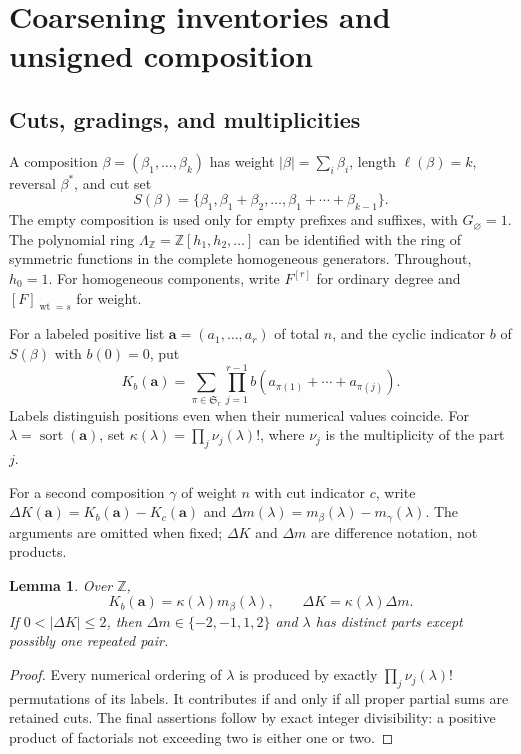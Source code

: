 \documentclass[11pt,a4paper]{amsart}
\numberwithin{equation}{section}
\theoremstyle{plain}
\newtheorem{lemma}[theorem]{Lemma}
\theoremstyle{definition}
\newcommand{\Z}{\mathbb Z}
\newcommand{\wt}{\operatorname{wt}}
\newcommand{\sort}{\operatorname{sort}}
\begin{document}
\section{Coarsening inventories and unsigned composition}\label{sec:algebra}

\subsection{Cuts, gradings, and multiplicities}
A composition \(\beta=(\beta_1,\ldots,\beta_k)\) has weight
\(|\beta|=\sum_i\beta_i\), length \(\ell(\beta)=k\), reversal \(\beta^*\), and cut set
\[
S(\beta)=\{\beta_1,\beta_1+\beta_2,\ldots,\beta_1+\cdots+\beta_{k-1}\}.
\]
The empty composition is used only for empty prefixes and suffixes, with
\(G_\varnothing=1\).  The polynomial ring
\(\Lambda_\Z=\Z[h_1,h_2,\ldots]\) can be identified with the ring of symmetric
functions in the complete homogeneous generators.  Throughout, \(h_0=1\).
For homogeneous components, write \(F^{[r]}\) for ordinary degree and
\([F]_{\wt=s}\) for weight.

For a labeled positive list \(\mathbf a=(a_1,\ldots,a_r)\) of total \(n\),
and the cyclic indicator \(b\) of \(S(\beta)\) with \(b(0)=0\), put
\begin{equation}\label{eq:K}
K_b(\mathbf a)=\sum_{\pi\in\mathfrak S_r}
 \prod_{j=1}^{r-1}b(a_{\pi(1)}+\cdots+a_{\pi(j)}).
\end{equation}
Labels distinguish positions even when their numerical values coincide.
For \(\lambda=\sort(\mathbf a)\), set
\(\kappa(\lambda)=\prod_j\nu_j(\lambda)!\), where \(\nu_j\) is the multiplicity
of the part \(j\).

For a second composition \(\gamma\) of weight \(n\) with cut indicator \(c\), write
\(\Delta K(\mathbf a)=K_b(\mathbf a)-K_c(\mathbf a)\) and
\(\Delta m(\lambda)=m_\beta(\lambda)-m_\gamma(\lambda)\).
The arguments are omitted when fixed; \(\Delta K\) and \(\Delta m\)
are difference notation, not products.

\begin{lemma}\label{lem:labels}
Over \(\Z\),
\begin{equation}\label{eq:label-factor}
K_b(\mathbf a)=\kappa(\lambda)m_\beta(\lambda),\qquad
\Delta K=\kappa(\lambda)\Delta m.
\end{equation}
If \(0<|\Delta K|\le2\), then \(\Delta m\in\{-2,-1,1,2\}\) and
\(\lambda\) has distinct parts except possibly one repeated pair.
\end{lemma}
\begin{proof}
Every numerical ordering of \(\lambda\) is produced by exactly
\(\prod_j\nu_j(\lambda)!\) permutations of its labels.  It contributes if and
only if all proper partial sums are retained cuts.  The final assertions
follow by exact integer divisibility: a positive product of factorials
not exceeding two is either one or two.
\end{proof}
\end{document}
